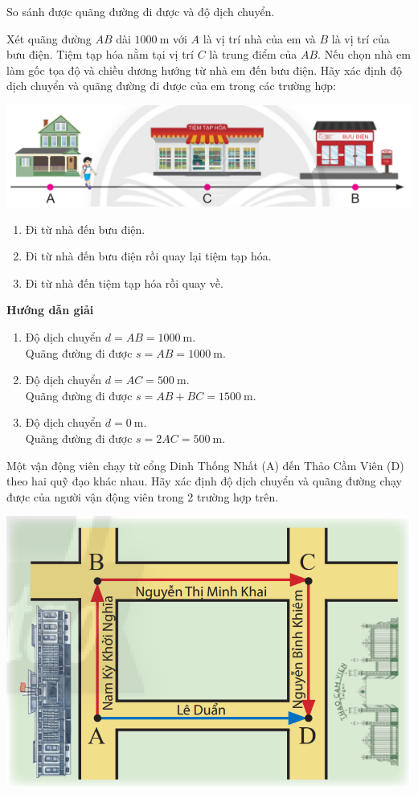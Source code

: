 \begin{dang}{So sánh được quãng đường đi được và độ dịch chuyển.}
{Xét quãng đường $AB$ dài $\SI{1000}{\meter}$ với $A$ là vị trí nhà của em và $B$ là vị trí của bưu điện. Tiệm tạp hóa nằm tại vị trí $C$ là trung điểm của $AB$. Nếu chọn nhà em làm gốc tọa độ và chiều dương hướng từ nhà em đến bưu điện. Hãy xác định độ dịch chuyển và quãng đường đi được của em trong các trường hợp:
	\begin{center}
		\includegraphics[width=0.6\linewidth]{../figs/VN10-2023-PH-TP004-2}
	\end{center}
	\begin{enumerate}[label=\alph*)]
		\item Đi từ nhà đến bưu điện.
		\item Đi từ nhà đến bưu điện rồi quay lại tiệm tạp hóa.
		\item Đi từ nhà đến tiệm tạp hóa rồi quay về. 
	\end{enumerate}	
}
{\begin{center}
		\textbf{Hướng dẫn giải}
	\end{center}
\begin{enumerate}[label=\alph*)]
	\item Độ dịch chuyển $d=AB=\SI{1000}{\meter}$.\\
	Quãng đường đi được $s=AB=\SI{1000}{\meter}$.
	\item Độ dịch chuyển $d=AC=\SI{500}{\meter}$.\\
	Quãng đường đi được $s=AB+BC=\SI{1500}{\meter}$.
	\item  Độ dịch chuyển $d=\SI{0}{\meter}$.\\
	Quãng đường đi được $s=2AC=\SI{500}{\meter}$.
\end{enumerate}
}
{Một vận động viên chạy từ cổng Dinh Thống Nhất (A) đến Thảo Cầm Viên (D) theo hai quỹ đạo khác nhau. Hãy xác định độ dịch chuyển và quãng đường chạy được của người vận động viên trong 2 trường hợp trên.
\begin{center}
	\includegraphics[width=0.5\linewidth]{../figs/VN10-2023-PH-TP004-3}

\end{center}}
\end{dang}
